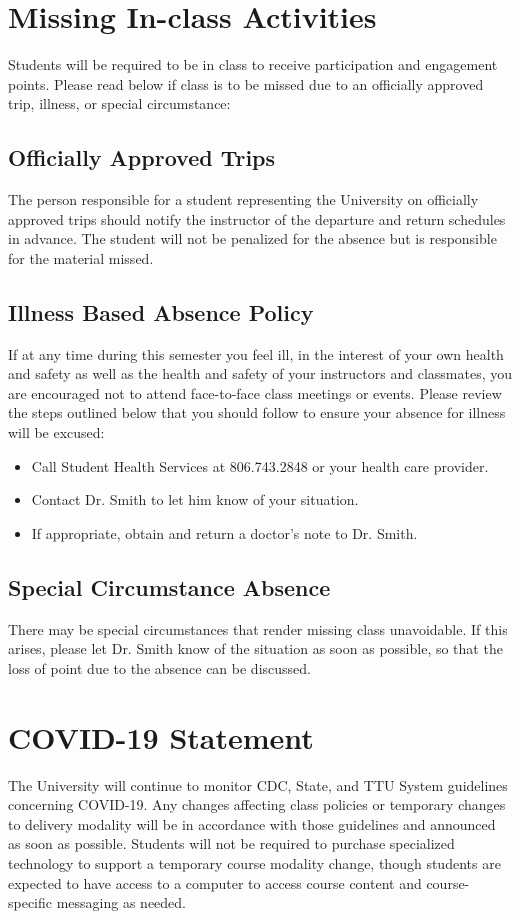 \documentclass[12pt, notitlepage]{article}   	%
\begin{document}
{\section{Missing In-class Activities}
Students will be required to be in class to receive participation and engagement points. 
Please read below if class is to be missed due to an officially approved trip, illness, or special circumstance:

\subsection{Officially Approved Trips}
The person responsible for a student representing the University on officially approved 
trips should notify the instructor of the departure and return schedules in advance.  
The student will not be penalized for the absence but is responsible for the material missed.

\subsection{Illness Based Absence Policy}
If at any time during this semester you feel ill, in the interest of your own health and 
safety as well as the health and safety of your instructors and classmates, you are 
encouraged not to attend face-to-face class meetings or events.  Please review the steps 
outlined below that you should follow to ensure your absence for illness will be excused:
\begin{itemize}
	\item{Call Student Health Services at 806.743.2848 or your health care provider.}
	\item{Contact Dr. Smith to let him know of your situation.}
	\item{If appropriate, obtain and return a doctor's note to Dr. Smith.}
\end{itemize}

\subsection{Special Circumstance Absence}
There may be special circumstances that render missing class unavoidable.
If this arises, please let Dr. Smith know of the situation as soon as possible,
so that the loss of point due to the absence can be discussed.

\section{COVID-19 Statement}
The University will continue to monitor CDC, State, and TTU System guidelines concerning COVID-19. 
Any changes affecting class policies or temporary changes to delivery modality will be in 
accordance with those guidelines and announced as soon as possible. Students will not be 
required to purchase specialized technology to support a temporary course modality change, 
though students are expected to have access to a computer to access course content and 
course-specific messaging as needed. 

}
\end{document}
